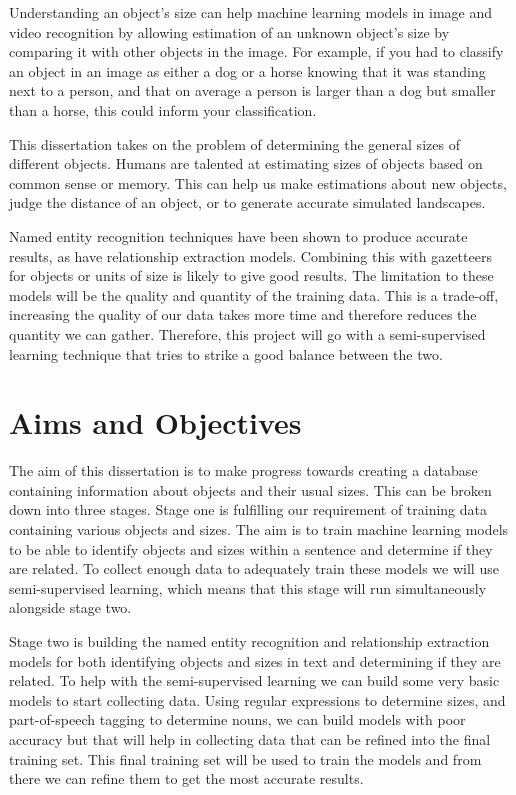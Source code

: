 \documentclass[11pt,oneside]{book}
\begin{document}
Understanding an object's size can help machine learning models in image and video recognition by allowing estimation of an unknown object's size by comparing it with other objects in the image. For example, if you had to classify an object in an image as either a dog or a horse knowing that it was standing next to a person, and that on average a person is larger than a dog but smaller than a horse, this could inform your classification.

This dissertation takes on the problem of determining the general sizes of different objects. Humans are talented at estimating sizes of objects based on common sense or memory. This can help us make estimations about new objects, judge the distance of an object, or to generate accurate simulated landscapes.

Named entity recognition techniques have been shown to produce accurate results, as have relationship extraction models. Combining this with gazetteers for objects or units of size is likely to give good results. The limitation to these models will be the quality and quantity of the training data. This is a trade-off, increasing the quality of our data takes more time and therefore reduces the quantity we can gather. Therefore, this project will go with a semi-supervised learning technique that tries to strike a good balance between the two.

\section{Aims and Objectives}

The aim of this dissertation is to make progress towards creating a database containing information about objects and their usual sizes. This can be broken down into three stages. Stage one is fulfilling our requirement of training data containing various objects and sizes. The aim is to train machine learning models to be able to identify objects and sizes within a sentence and determine if they are related. To collect enough data to adequately train these models we will use semi-supervised learning, which means that this stage will run simultaneously alongside stage two.

Stage two is building the named entity recognition and relationship extraction models for both identifying objects and sizes in text and determining if they are related. To help with the semi-supervised learning we can build some very basic models to start collecting data. Using regular expressions to determine sizes, and part-of-speech tagging to determine nouns, we can build models with poor accuracy but that will help in collecting data that can be refined into the final training set. This final training set will be used to train the models and from there we can refine them to get the most accurate results.
\end{document}
